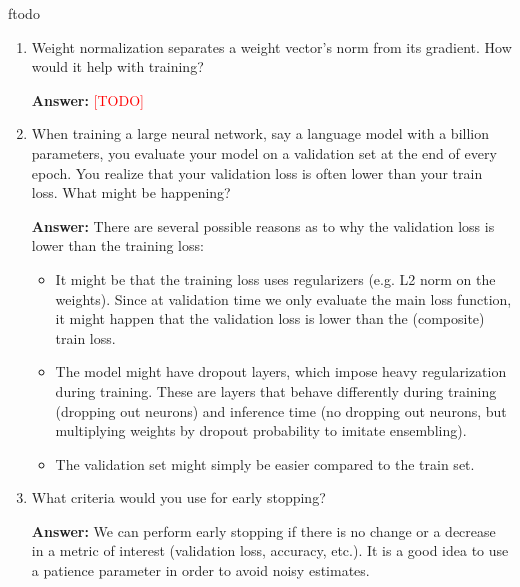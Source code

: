 ƒtodo\documentclass{article}
\newenvironment{QandA}{\begin{enumerate}[label=\arabic*.]}{\end{enumerate}}
\newenvironment{answer}{\par\normalfont \textbf{Answer:}}{}
\newcommand{\todo}{\textcolor{red}{[TODO]}}
\begin{document}
\begin{QandA}
    \item Weight normalization separates a weight vector’s norm from its gradient. How would it help with training?
    \begin{answer}
        \todo
    \end{answer}

    \item When training a large neural network, say a language model with a billion parameters, you evaluate your model on a validation set at the end of every epoch. You realize that your validation loss is often lower than your train loss. What might be happening?
    \begin{answer}
        There are several possible reasons as to why the validation loss is lower than the training loss:
        \begin{itemize}
            \item It might be that the training loss uses regularizers (e.g. L2 norm on the weights). Since at validation time we only evaluate the main loss function, it might happen that the validation loss is lower than the (composite) train loss. 
            \item The model might have dropout layers, which impose heavy regularization during training. These are layers that behave differently during training (dropping out neurons) and inference time (no dropping out neurons, but multiplying weights by dropout probability to imitate ensembling). 
            \item The validation set might simply be easier compared to the train set.
        \end{itemize}
    \end{answer}

    \item What criteria would you use for early stopping?
    \begin{answer}
        We can perform early stopping if there is no change or a decrease in a metric of interest (validation loss, accuracy, etc.). It is a good idea to use a patience parameter in order to avoid noisy estimates. 
    \end{answer}


\end{QandA}
\end{document}
